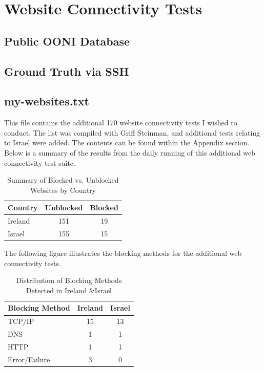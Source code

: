 \section{Website Connectivity Tests}
\subsection{Public OONI Database}
\subsection{Ground Truth via SSH}
\subsection{my-websites.txt}
This file contains the additional 170 website connectivity tests I wished to conduct. The list was compiled with Griff Steinman, and additional tests relating to Israel were added. The contents can be found within the Appendix section. Below is a summary of the results from the daily running of this additional web connectivity test suite.

\begin{table}[H]
\centering
\caption{Summary of Blocked vs. Unblocked Websites by Country}
\begin{tabular}{lcc}
\toprule
\textbf{Country} & \textbf{Unblocked} & \textbf{Blocked} \\
\midrule
Ireland & 151 & 19 \\
Israel    & 155 & 15 \\   
\bottomrule
\end{tabular}
\label{tab:blocked_summary}
\end{table}

The following figure illustrates the blocking methods for the additional web connectivity tests. 

\begin{table}[H]
\centering
\caption{Distribution of Blocking Methods Detected in Ireland \&Israel}
\begin{tabular}{lcc}
\toprule
\textbf{Blocking Method} & \textbf{Ireland} & \textbf{Israel} \\
\midrule
TCP/IP         & 15 & 13 \\
DNS            & 1  & 1  \\
HTTP           & 1  & 1  \\
Error/Failure  & 3  & 0  \\
\bottomrule
\end{tabular}
\label{tab:blocking_methods_comparison}
\end{table}

